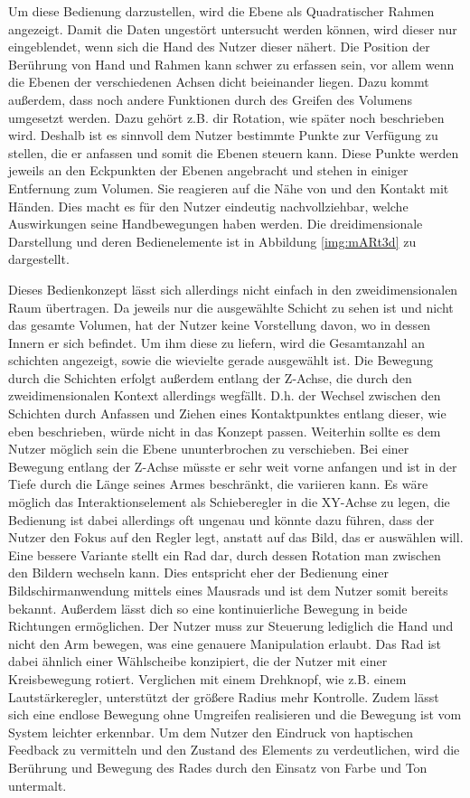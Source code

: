Um diese Bedienung darzustellen, wird die Ebene als Quadratischer Rahmen angezeigt. Damit die Daten ungestört untersucht werden können, wird dieser nur eingeblendet, wenn sich die Hand des Nutzer dieser nähert. 
Die Position der Berührung von Hand und Rahmen kann schwer zu erfassen sein, vor allem wenn die Ebenen der verschiedenen Achsen dicht beieinander liegen. Dazu kommt außerdem, dass noch andere Funktionen durch des Greifen des Volumens umgesetzt werden. Dazu gehört z.B. dir Rotation, wie später noch beschrieben wird. Deshalb ist es sinnvoll dem Nutzer bestimmte Punkte zur Verfügung zu stellen, die er anfassen und somit die Ebenen steuern kann. Diese Punkte werden jeweils an den Eckpunkten der Ebenen angebracht und stehen in einiger Entfernung zum Volumen. Sie reagieren auf die Nähe von und den Kontakt mit Händen. Dies macht es für den Nutzer eindeutig nachvollziehbar, welche Auswirkungen seine Handbewegungen haben werden. 
Die dreidimensionale Darstellung und deren Bedienelemente ist in Abbildung \ref{img:mARt3d} zu dargestellt.

Dieses Bedienkonzept lässt sich allerdings nicht einfach in den zweidimensionalen Raum übertragen. Da jeweils nur die ausgewählte Schicht zu sehen ist und nicht das gesamte Volumen, hat der Nutzer keine Vorstellung davon, wo in dessen Innern er sich befindet. Um ihm diese zu liefern, wird die Gesamtanzahl an schichten angezeigt, sowie die wievielte gerade ausgewählt ist. 
Die Bewegung durch die Schichten erfolgt außerdem entlang der Z-Achse, die durch den zweidimensionalen Kontext allerdings wegfällt. D.h. der Wechsel zwischen den Schichten durch Anfassen und Ziehen eines Kontaktpunktes entlang dieser, wie eben beschrieben, würde nicht in das Konzept passen. 
Weiterhin sollte es dem Nutzer möglich sein die Ebene ununterbrochen zu verschieben. Bei einer Bewegung entlang der Z-Achse müsste er sehr weit vorne anfangen und ist in der Tiefe durch die Länge seines Armes beschränkt, die  variieren kann. Es wäre möglich das Interaktionselement als Schieberegler in die XY-Achse zu legen, die Bedienung ist dabei allerdings oft ungenau und könnte dazu führen, dass der Nutzer den Fokus auf den Regler legt, anstatt auf das Bild, das er auswählen will. Eine bessere Variante stellt ein Rad dar, durch dessen Rotation man zwischen den Bildern wechseln kann. Dies entspricht eher der Bedienung einer Bildschirmanwendung mittels eines Mausrads und ist dem Nutzer somit bereits bekannt. Außerdem lässt dich so eine kontinuierliche Bewegung in beide Richtungen ermöglichen. Der Nutzer muss zur Steuerung lediglich die Hand und nicht den Arm bewegen, was eine genauere Manipulation erlaubt. 
Das Rad ist dabei ähnlich einer Wählscheibe konzipiert, die der Nutzer mit einer Kreisbewegung rotiert. Verglichen mit einem Drehknopf, wie z.B. einem Lautstärkeregler, unterstützt der größere Radius mehr Kontrolle. Zudem lässt sich eine endlose Bewegung ohne Umgreifen realisieren und die Bewegung ist vom System leichter erkennbar. 
Um dem Nutzer den Eindruck von haptischen Feedback zu vermitteln und den Zustand des Elements zu verdeutlichen, wird die Berührung und Bewegung des Rades durch den Einsatz von Farbe und Ton untermalt.

